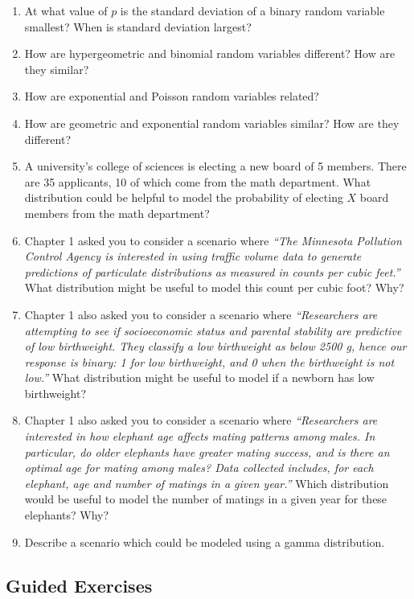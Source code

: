 \documentclass[
]{krantz}
\begin{document}
\begin{enumerate}
\def\labelenumi{\arabic{enumi}.}
\item
  At what value of \(p\) is the standard deviation of a binary random variable smallest? When is standard deviation largest?
\item
  How are hypergeometric and binomial random variables different? How are they similar?
\item
  How are exponential and Poisson random variables related?
\item
  How are geometric and exponential random variables similar? How are they different?
\item
  A university's college of sciences is electing a new board of 5 members. There are 35 applicants, 10 of which come from the math department. What distribution could be helpful to model the probability of electing \(X\) board members from the math department?
\item
  Chapter 1 asked you to consider a scenario where \emph{``The Minnesota Pollution Control Agency is interested in using traffic volume data to generate predictions of particulate distributions as measured in counts per cubic feet.''} What distribution might be useful to model this count per cubic foot? Why?
\item
  Chapter 1 also asked you to consider a scenario where \emph{``Researchers are attempting to see if socioeconomic status and parental stability are predictive of low birthweight. They classify a low birthweight as below 2500 g, hence our response is binary: 1 for low birthweight, and 0 when the birthweight is not low.''} What distribution might be useful to model if a newborn has low birthweight?
\item
  Chapter 1 also asked you to consider a scenario where \emph{``Researchers are interested in how elephant age affects mating patterns among males. In particular, do older elephants have greater mating success, and is there an optimal age for mating among males? Data collected includes, for each elephant, age and number of matings in a given year.''} Which distribution would be useful to model the number of matings in a given year for these elephants? Why?
\item
  Describe a scenario which could be modeled using a gamma distribution.
\end{enumerate}

\subsection{Guided Exercises}\label{guided-exercises-2}
\end{document}
